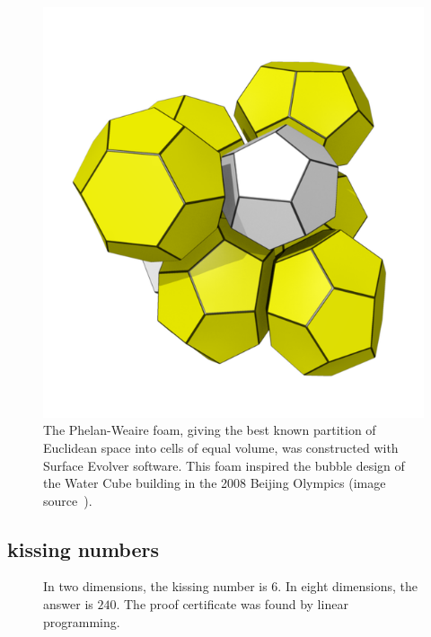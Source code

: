 \documentclass{llncs}
\begin{document}
\begin{figure}[h!]
  \centering
\includegraphics[scale=0.28]{557px-Foam_-_Weaire-Phelan_structure.png}
\caption{The Phelan-Weaire foam, giving the best known partition of
  Euclidean space into cells of equal volume, was constructed with
  Surface Evolver software.  This foam inspired the bubble design of
  the Water Cube building in the 2008 Beijing Olympics (image
  source~\cite{phelan-graphic}).  }
\label{fig:PW}
\end{figure}



\subsection{kissing numbers} 


\begin{figure}[h!]
  \centering
\figKISSING
\caption{In two dimensions, the kissing number is $6$. In eight
  dimensions, the answer is $240$.  The proof certificate was found by
  linear programming.}
\label{fig:kissing}
\end{figure}
\end{document}
